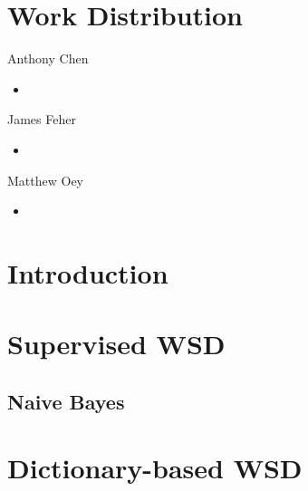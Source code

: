 \documentclass[11pt]{article}
\begin{document}
\lstset{language=Python}
\setlength{\parindent}{0in}
\addtolength{\parskip}{0.1cm}
\setlength{\fboxrule}{.5mm}\setlength{\fboxsep}{1.2mm}
\newlength{\boxlength}\setlength{\boxlength}{\textwidth}
\addtolength{\boxlength}{-4mm}

\begin{center}
\end{center}

\section{Work Distribution}

\begin{multicols}{3}
Anthony Chen
\begin{itemize}
	\item
\end{itemize}

\columnbreak

James Feher
\begin{itemize}
	\item
\end{itemize}

\columnbreak

Matthew Oey
\begin{itemize}
	\item
\end{itemize}

\end{multicols}

\section{Introduction}

\section{Supervised WSD}

\subsection{Naive Bayes}

\section{Dictionary-based WSD}
\end{document}
